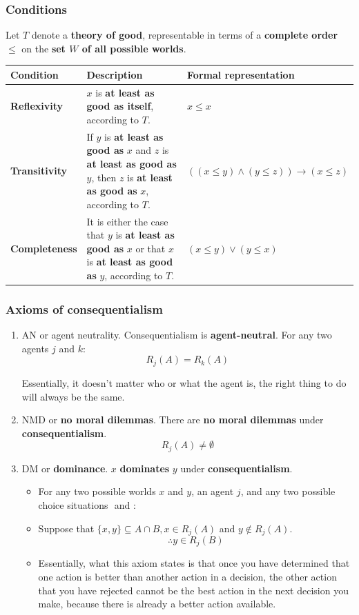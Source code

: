 \documentclass[11pt]{article}
\begin{document}
\subsubsection{Conditions}
\label{sec:orgc9bb49a}
Let \(T\) denote a \textbf{theory of good}, representable in terms of a \textbf{complete order} \(\le\) on the \textbf{set \(W\) of all possible worlds}.

\begin{center}
\begin{tabularx}{\textwidth}{|X|X|X|}
\hline
Condition & Description & Formal representation\\
\hline
\textbf{Reflexivity} & \(x\) is \textbf{at least as good as itself}, according to \(T\). & \(x \le x\)\\
\hline
\textbf{Transitivity} & If \(y\) is \textbf{at least as good as} \(x\) and \(z\) is \textbf{at least as good as} \(y\), then \(z\) is \textbf{at least as good as} \(x\), according to \(T\). & \(((x \le y) \wedge (y \le z)) \rightarrow (x \le z)\)\\
\hline
\textbf{Completeness} & It is either the case that \(y\) is \textbf{at least as good as} \(x\) or that \(x\) is \textbf{at least as good as} \(y\), according to \(T\). & \((x \le y) \vee (y \le x)\)\\
\hline
\end{tabularx}
\end{center}

 \newpage
\subsubsection{Axioms of consequentialism}
\label{sec:org7867da5}
\begin{enumerate}
\item AN or agent neutrality. Consequentialism is \textbf{agent-neutral}.
For any two agents \(j\) and \(k\):
\[R_j (A) = R_k (A)\]

Essentially, it doesn't matter who or what the agent is, the right thing to do will always be the same.

\item NMD or \textbf{no moral dilemmas}. There are \textbf{no moral dilemmas} under \textbf{consequentialism}.
\[R_j (A) \ne \emptyset\]

\item DM or \textbf{dominance}. \(x\) \textbf{dominates} \(y\) under \textbf{consequentialism}.
\begin{itemize}
\item For any two possible worlds \(x\) and \(y\), an agent \(j\), and any two possible choice situations \(<j, A>\) and \(<j, B>\):
\item Suppose that \(\{x, y\} \subseteq A \cap B, x \in R_j (A)\) and \(y \notin R_j (A)\).
\[\therefore y \in R_j (B)\]
\item Essentially, what this axiom states is that once you have determined that one action is better than another action in a decision, the other action that you have rejected cannot be the best action in the next decision you make, because there is already a better action available.
\end{itemize}
\end{enumerate}
\end{document}
